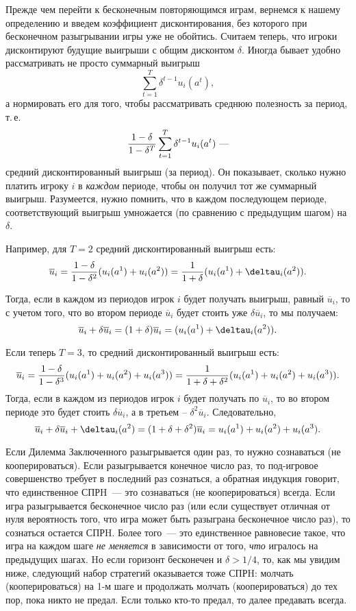 Прежде чем перейти к бесконечным повторяющимся играм, вернемся к
нашему определению и введем коэффициент дисконтирования, без
которого при бесконечном разыгрывании игры уже не обойтись. Считаем
теперь, что игроки дисконтируют будущие выигрыши с общим дисконтом
$\delta$. Иногда бывает удобно рассматривать не просто суммарный выигрыш
$$
\sum^T_{t=1}\delta^{t-1}u_i(a^t),
$$
а нормировать его для того, чтобы рассматривать среднюю полезность
за период, т.\,е.
$$
{{1-\delta}\over{1-\delta^T}}\sum^T_{t=1}\delta^{t-1}u_i(a^t)~\mbox{---}
$$
средний дисконтированный выигрыш (за период).
Он показывает, сколько нужно платить игроку $i$ в {\it каждом}
периоде, чтобы он получил тот же суммарный выигрыш. Разумеется,
нужно помнить, что в каждом последующем периоде, соответствующий
выигрыш умножается (по сравнению с предыдущим шагом) на $\delta$.

Например, для $T=2$ средний дисконтированный выигрыш есть:
$$\overline{u}_i={{1-\delta}\over{1-\delta^2}}(u_i(a^1)+u_i(a^2))=
{{1}\over{1+\delta}}(u_i(a^1)+\deltau_i(a^2)).$$

Тогда, если в каждом из периодов игрок $i$ будет получать выигрыш,
равный $\overline{u}_i$, то с учетом того, что во втором периоде
$\overline{u}_i$ будет стоить уже $\delta\overline{u}_i$, то мы получаем:
$$\overline{u}_i+\delta\overline{u}_i=(1+\delta)\overline{u}_i=
(u_i(a^1)+\deltau_i(a^2)).$$

Если теперь $T=3$, то средний дисконтированный выигрыш есть:
$$\overline{u}_i={{1-\delta}\over{1-\delta^3}}(u_i(a^1)+u_i(a^2)+u_i(a^3))=
{{1}\over{1+\delta+\delta^2}}(u_i(a^1)+u_i(a^2)+u_i(a^3)).$$
Тогда, если в каждом из периодов игрок $i$ будет получать по $\overline{u}_i$,
то во втором периоде это будет стоить $\delta\overline{u}_i$, а в третьем --
$\delta^2\overline{u}_i$. Следовательно,
$$\overline{u}_i+\delta\overline{u}_i+\deltau_i(a^2)=(1+\delta+\delta^2)\overline{u}_i=
u_i(a^1)+u_i(a^2)+u_i(a^3).$$

Если Дилемма Заключенного разыгрывается один раз, то  нужно
сознаваться (не кооперироваться). Если разыгрывается конечное число раз,
то под-игровое совершенство требует в последний раз
сознаться, а обратная индукция говорит, что единственное
СПРH~--- это сознаваться (не кооперироваться) всегда. Если игра разыгрывается
бесконечное число раз (или если существует отличная от нуля вероятность
того, что игра может быть разыграна бесконечное число раз), то сознаться
остается СПРH.  Более
того~--- это единственное равновесие такое, что игра на каждом шаге
{\it не меняется} в зависимости от того, \emph{что} игралось на предыдущих
шагах. Hо если горизонт бесконечен и $\delta>1/4$, то, как мы увидим
ниже, следующий набор стратегий оказывается тоже СПРH: молчать
(кооперироваться) на 1-м шаге и продолжать молчать
(кооперироваться) до тех пор, пока никто не предал. Если только кто-то
предал, то далее предавать всегда.
\smallskip

